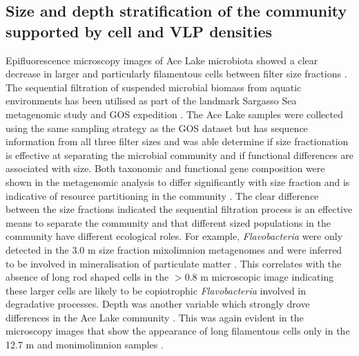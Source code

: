 
\subsection[Community stratification supported by cell and \acs{VLP} densities]{Size and depth stratification of the community supported by cell and \acs{VLP} densities}

Epifluorescence microscopy images of Ace Lake microbiota showed a clear decrease in larger and particularly filamentous cells between filter size fractions .
The sequential filtration of suspended microbial biomass from aquatic environments has been utilised as part of the landmark Sargasso Sea metagenomic study \cite{Venter2004} and \ac{GOS} expedition \cite{Rusch2007}.
The Ace Lake samples were collected using the same sampling strategy as the \ac{GOS} dataset but has sequence information from all three filter sizes and was able determine if size fractionation is effective at separating the microbial community and if functional differences are associated with size.
Both taxonomic and functional gene composition were shown in the metagenomic analysis to differ significantly with size fraction and is indicative of resource partitioning in the community \cite{Lauro2011}.
The clear difference between the size fractions indicated the sequential filtration process is an effective means to separate the community and that different sized populations in the community have different ecological roles.
For example, \emph{Flavobacteria} were only detected in the 3.0 \textmu{}m size fraction mixolimnion metagenomes and were inferred to be involved in mineralisation of particulate matter \cite{Lauro2011}.
This correlates with the absence of long rod shaped cells in the $>$0.8 \textmu{}m microscopic image  indicating these larger cells are likely to be copiotrophic \emph{Flavobacteria} involved in degradative processes.
Depth was another variable which strongly drove differences in the Ace Lake community \cite{Lauro2011}.
This was again evident in the microscopy images that show the appearance of long filamentous cells only in the 12.7 m and monimolimnion samples .


